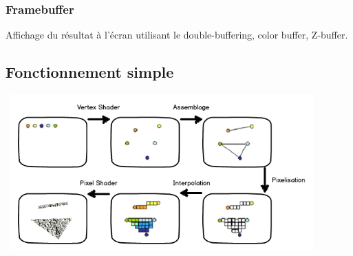 \subsubsection{Framebuffer}
Affichage du résultat à l’écran utilisant le double-buffering, color buffer, Z-buffer.

\subsection{Fonctionnement simple}
\begin{center}
\includegraphics[width=12cm,height=60mm]{leo/images/pipelineSimple.png}
\end{center}